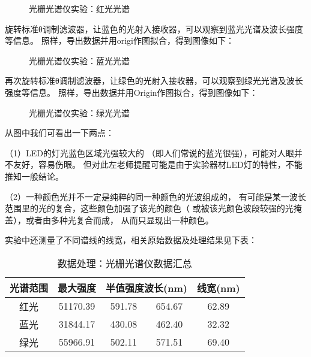 \documentclass[11pt]{article}
\begin{document}
\begin{figure}[H]
    \centering
    \hspace{0.5cm}
    \caption{光栅光谱仪实验：红光光谱}
\end{figure}

旋转标准θ调制滤波器，让蓝色的光射入接收器，可以观察到蓝光光谱及波长强度等信息。
照样，导出数据并用origi作图拟合，得到图像如下：
\begin{figure}[H]
    \centering
    \hspace{0.5cm}
    \caption{光栅光谱仪实验：蓝光光谱}
\end{figure}

再次旋转标准θ调制滤波器，让绿色的光射入接收器，可以观察到绿光光谱及波长强度等信息。
照样，导出数据并用Origin作图拟合，得到图像如下：
\begin{figure}[H]
    \centering
    \hspace{0.5cm}
    \caption{光栅光谱仪实验：绿光光谱}
\end{figure}

从图中我们可看出一下两点：

（1）LED的灯光蓝色区域光强较大的
（即人们常说的蓝光很强），可能对人眼并不友好，容易伤眼。
但对此左老师提醒可能是由于实验器材LED灯的特性，不能推知一般结论。

（2）一种颜色光并不一定是纯粹的同一种颜色的光波组成的，
有可能是某一波长范围里的光的复合，这些颜色加强了该光的颜色（
或被该光颜色波段较强的光掩盖），或者由多种光复合而成，
从而只显现出一种颜色。

实验中还测量了不同谱线的线宽，相关原始数据及处理结果见下表：
\begin{table}[H]
    \centering
    \begin{tabular}{ccccc}
        \toprule
        光谱范围 & 最大强度 & \multicolumn{2}{c}{半值强度波长(nm) } & 线宽(nm) \\ 
      \midrule
        红光 & 51170.39  & 591.78  & 654.67  & 62.89  \\ 
        蓝光 & 31844.17  & 430.08  & 462.40  & 32.32  \\ 
        绿光 & 55966.91  & 502.11  & 571.51  & 69.40 \\ 
        \bottomrule
    \end{tabular}
    \caption{数据处理：光栅光谱仪数据汇总}
\end{table}
\end{document}
